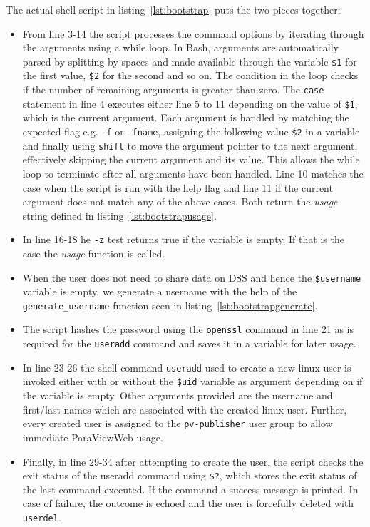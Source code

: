 

The actual shell script in listing~\ref{lst:bootstrap} puts the two pieces
together:

\begin{itemize}
    \item From line 3-14 the script processes the command options by iterating
    through the arguments using a while loop. In Bash, arguments are
    automatically parsed by splitting by spaces and made available through the
    variable \texttt{\$1} for the first value, \texttt{\$2} for the second and
    so on. The condition in the loop checks if the number of remaining arguments
    is greater than zero. The \texttt{case} statement in line 4 executes either
    line 5 to 11 depending on the value of \texttt{\$1}, which is the current
    argument. Each argument is handled by matching the expected flag e.g.
    \texttt{-f} or \texttt{--fname}, assigning the following value \texttt{\$2}
    in a variable and finally using \texttt{shift} to move the argument pointer
    to the next argument, effectively skipping the current argument and its
    value. This allows the while loop to terminate after all arguments have been
    handled. Line 10 matches the case when the script is run with the help flag
    and line 11 if the current argument does not match any of the above cases.
    Both return the \textit{usage} string defined in
    listing~\ref{lst:bootstrapusage}.
    \item In line 16-18 he \texttt{-z} test returns true if the variable is
    empty. If that is the case the \textit{usage} function is called.
    \item When the user does not need to share data on DSS and hence the
    \texttt{\$username} variable is empty, we generate a username with the help
    of the \texttt{generate\_username} function seen in
    listing~\ref{lst:bootstrapgenerate}.
    \item The script hashes the password using the \texttt{openssl} command in
    line 21 as is required for the \texttt{useradd} command and saves it in a
    variable for later usage.
    \item In line 23-26 the shell command \texttt{useradd} used to create a new
    linux user is invoked either with or without the \texttt{\$uid} variable as
    argument depending on if the variable is empty. Other arguments provided are
    the username and first/last names which are associated with the created
    linux user. Further, every created user is assigned to the
    \texttt{pv-publisher} user group to allow immediate ParaViewWeb usage.
    \item Finally, in line 29-34 after attempting to create the user, the script
    checks the exit status of the useradd command using \texttt{\$?}, which
    stores the exit status of the last command executed. If the command a
    success message is printed. In case of failure, the outcome is echoed and
    the user is forcefully deleted with \texttt{userdel}.
\end{itemize}


